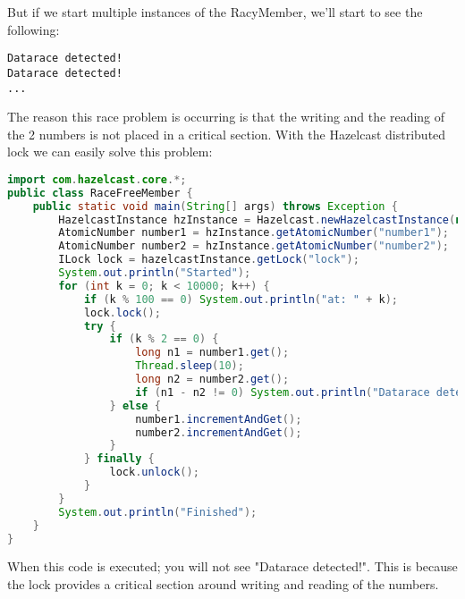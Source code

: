 But if we start multiple instances of the RacyMember, we'll start to see the following:
\begin{lstlisting}
Datarace detected!
Datarace detected!
...
\end{lstlisting}
The reason this race problem is occurring is that the writing and the reading of the 2 numbers is not placed in a critical section. With the Hazelcast distributed lock we can easily solve this problem:
\begin{lstlisting}[language=java]
import com.hazelcast.core.*;
public class RaceFreeMember {
    public static void main(String[] args) throws Exception {
        HazelcastInstance hzInstance = Hazelcast.newHazelcastInstance(null);
        AtomicNumber number1 = hzInstance.getAtomicNumber("number1");
        AtomicNumber number2 = hzInstance.getAtomicNumber("number2");
        ILock lock = hazelcastInstance.getLock("lock");
        System.out.println("Started");
        for (int k = 0; k < 10000; k++) {
            if (k % 100 == 0) System.out.println("at: " + k);
            lock.lock();
            try {
                if (k % 2 == 0) {
                    long n1 = number1.get();
                    Thread.sleep(10);
                    long n2 = number2.get();
                    if (n1 - n2 != 0) System.out.println("Datarace detected!");
                } else {
                    number1.incrementAndGet();
                    number2.incrementAndGet();
                }
            } finally {
                lock.unlock();
            }
        }
        System.out.println("Finished");
    }
}
\end{lstlisting}
When this code is executed; you will not see "Datarace detected!". This is because the lock provides a critical section around writing and reading of the numbers. 

